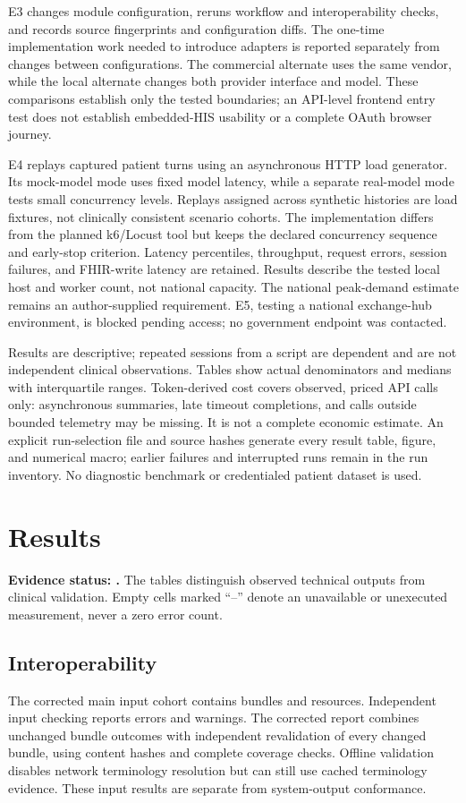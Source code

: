 E3 changes module configuration, reruns workflow and interoperability checks, and
records source fingerprints and configuration diffs. The one-time implementation
work needed to introduce adapters is reported separately from changes between
configurations. The commercial alternate uses the same vendor, while the local
alternate changes both provider interface and model. These comparisons establish
only the tested boundaries; an API-level frontend entry test does not establish
embedded-HIS usability or a complete OAuth browser journey.

E4 replays captured patient turns using an asynchronous HTTP load generator.
Its mock-model mode uses fixed model latency, while a separate real-model mode
tests small concurrency levels. Replays assigned across synthetic histories are
load fixtures, not clinically consistent scenario cohorts. The implementation
differs from the planned k6/Locust tool but keeps
the declared concurrency sequence and early-stop criterion. Latency percentiles,
throughput, request errors, session failures, and FHIR-write latency are retained.
Results describe the tested local host and worker count, not national capacity.
The national peak-demand estimate remains an author-supplied requirement. E5,
testing a national exchange-hub environment, is blocked pending access; no
government endpoint was contacted.

Results are descriptive; repeated sessions from a script are dependent and are
not independent clinical observations. Tables show actual denominators and
medians with interquartile ranges. Token-derived cost covers observed, priced
API calls only: asynchronous summaries, late timeout completions, and calls
outside bounded telemetry may be missing. It is not a complete economic estimate.
An explicit run-selection file and source hashes generate every result table,
figure, and numerical macro; earlier failures and interrupted runs remain in the
run inventory. No diagnostic benchmark or credentialed patient dataset is used.

\section{Results}\label{sec:results}
\textbf{Evidence status: \ResultsStatus.} The tables distinguish observed
technical outputs from clinical validation. Empty cells marked ``--'' denote an
unavailable or unexecuted measurement, never a zero error count.

\subsection{Interoperability}
The corrected main input cohort contains \InputBundles{} bundles and
\InputResources{} resources. Independent input checking reports \InputErrors{}
errors and \InputWarnings{} warnings. The corrected report combines unchanged
bundle outcomes with independent revalidation of every changed bundle, using
content hashes and complete coverage checks. Offline validation disables network
terminology resolution but can still use cached terminology evidence. These input
results are separate from system-output conformance.

